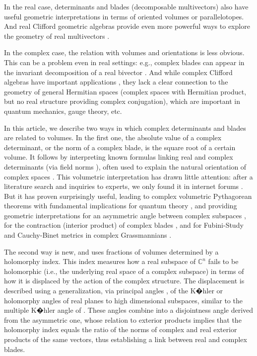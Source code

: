 \documentclass{birkjour}
\newcommand{\CITE}[1]{\todo[color=cyan!30]{#1}}  %
\theoremstyle{definition}
\def\C			{\mathds{C}}
\begin{document}
In the real case, determinants and blades (decomposable multivectors) also have useful geometric interpretations in terms of oriented volumes or parallelotopes.
And real Clifford geometric algebras provide even more powerful ways to explore the geometry of real multivectors \cite{Corrochano2001,Hestenes1984,Rosen2019}.

In the complex case, the relation with volumes and orientations is less obvious.
This can be a problem even in real settings:
e.g., complex blades can appear in the invariant decomposition of a real bivector \cite{Roelfs2023}.
And while complex Clifford algebras have important applications \cite{Hrdina2022,Sabadini2014,Stoica2018}, they lack a clear connection to the geometry of general Hermitian spaces (complex spaces with Hermitian product, but no real structure providing complex conjugation), which are important in quantum mechanics, gauge theory, etc.

In this article, we describe two ways in which complex determinants and blades are related to volumes.
In the first one, the absolute value of a complex determinant, or the norm of a complex blade, is the square root of a certain volume. 
It follows by interpreting known formulas linking real and complex determinants (via field norms \cite{Bourbaki1989}), often used to explain the natural orientation of complex spaces \cite{Greub1978,Griffiths1994}.
	\CITE{Greub1978 p.188, Griffiths1994 p.18}
This volumetric interpretation has drawn little attention:
after a literature search and inquiries to experts, we only found it in internet forums \cite{Lahtonen2012,Malyshev2016}.
But it has proven surprisingly useful, leading to complex volumetric Py\-thag\-o\-re\-an theorems \cite{Mandolesi_Pythagorean} with fundamental implications for quantum theory \cite{Mandolesi_Born},
and providing geometric interpretations for an asymmetric angle between complex subspaces \cite{Mandolesi_Grassmann,Mandolesi_Products}, for the contraction (interior product) of complex blades \cite{Mandolesi_Contractions},
and for Fubini-Study and Cauchy-Binet metrics in complex Grassmannians \cite{Mandolesi_TotalGrassmannian}.

The second way is new, and uses fractions of volumes determined by a holomorphy index. 
This index measures how a real subspace of $\C^n$ fails to be holomorphic (i.e., the underlying real space of a complex subspace) in terms of how it is displaced by the action of the complex structure.
The displacement is described using a generalization, via principal angles \cite{Bjorck1973,Galantai2006}, of the K�hler or holomorphy angles of real planes \cite{Goldman1999,Rosenfeld1997,Scharnhorst2001} to high dimensional subspaces,  
similar to the multiple K�hler angle of \cite{Tasaki2001}.
These angles combine into a disjointness angle derived from the asymmetric one, whose relation to exterior products \cite{Mandolesi_Grassmann,Mandolesi_Products}
implies that the holomorphy index equals the ratio of the norms of complex and real exterior products of the same vectors,
thus establishing a link between real and complex blades.
\end{document}
